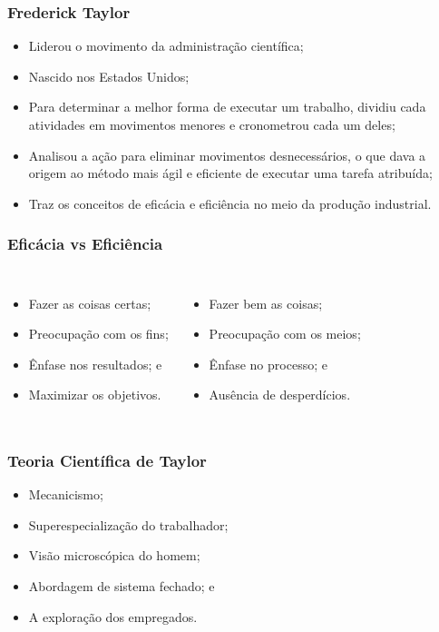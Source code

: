\documentclass[aspectratio=169]{beamer}
\begin{document}
\begin{frame}
	\frametitle{Frederick Taylor}

	\begin{itemize}
		\item Liderou o movimento da administra\c cão científica;
		\item Nascido nos Estados Unidos;
		\item Para determinar a melhor forma de executar um trabalho, dividiu cada atividades em movimentos menores e cronometrou cada um deles;
		\item Analisou a a\c cão para eliminar movimentos desnecessários, o que dava a origem ao método mais ágil e eficiente de executar uma tarefa atribuída;
		\item Traz os conceitos de eficácia e eficiência no meio da produ\c cão industrial.
	\end{itemize}
\end{frame}

\begin{frame}
	\frametitle{Eficácia vs Eficiência}

\begin{columns}

	\begin{itemize}
		\item Fazer as coisas certas;
		\item Preocupa\c cão com os fins;
		\item Ênfase nos resultados; e
		\item Maximizar os objetivos.
	\end{itemize}
		

	\begin{itemize}
		\item Fazer bem as coisas;
		\item Preocupa\c cão com os meios;
		\item Ênfase no processo; e
		\item Ausência de desperdícios.
	\end{itemize}
\end{columns}

\end{frame}

\begin{frame}
	\frametitle{Teoria Científica de Taylor}

	\begin{itemize}
		\item Mecanicismo;
		\item Superespecializa\c cão do trabalhador;
		\item Visão microscópica do homem;
		\item Abordagem de sistema fechado; e
		\item A explora\c cão dos empregados.
	\end{itemize}
\end{frame}
\end{document}
